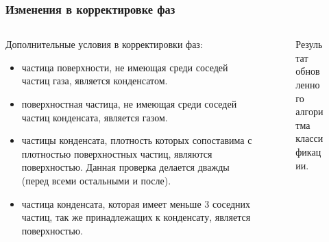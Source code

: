 \documentclass[pdf,hyperref={unicode}]{beamer}
\begin{document}
\begin{frame}
\transdissolve[duration=0.2]
\frametitle{Изменения в корректировке фаз}

\begin{columns}

\begin{column}{0.47\linewidth}
{\tiny{
Дополнительные условия в корректировки фаз:
\begin{itemize}
\item частица поверхности, не имеющая среди соседей частиц газа, является конденсатом.
\item поверхностная частица, не имеющая среди соседей частиц конденсата, является газом.
\item частицы конденсата, плотность которых сопоставима с плотностью поверхностных частиц, являются поверхностью. Данная проверка делается дважды (перед всеми остальными и после).
\item частица конденсата, которая имеет меньше 3 соседних частиц, так же принадлежащих к конденсату, является поверхностью.
\end{itemize}
}}
\end{column}


\begin{column}{0.47\linewidth}
{
\begin{figure}[h]
\caption{\tiny Результат обновленного алгоритма классификации.}
\end{figure}
}
\end{column}

\end{columns}

\end{frame}
\end{document}
